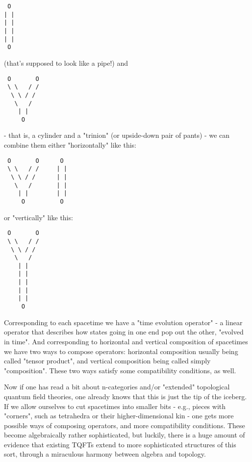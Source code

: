 \begin{verbatim}
 O
| |
| |
| |
| |
 O
\end{verbatim}
    

(that's supposed to look like a pipe!) and 

\begin{verbatim}
 O       O
 \ \   / /
  \ \ / /
   \   /
    | |
     O
\end{verbatim}
    

- that is, a cylinder and a "trinion" (or upside-down pair of pants) - 
we can combine them either "horizontally" like this:

\begin{verbatim}
 O       O      O
 \ \   / /     | |
  \ \ / /      | |
   \   /       | |
    | |        | | 
     O          O
\end{verbatim}
    

or "vertically" like this:

\begin{verbatim}
 O       O
 \ \   / /
  \ \ / /
   \   /
    | |
    | |
    | |
    | |
    | |
     O
\end{verbatim}
    

Corresponding to each spacetime we have a "time evolution operator" -
a linear operator that describes how states going in one end pop out the
other, "evolved in time".  And corresponding to horizontal and vertical 
composition of spacetimes we have two ways to compose operators: 
horizontal composition usually being called "tensor product", and 
vertical composition being called simply "composition".  These two ways 
satisfy some compatibility conditions, as well.

Now if one has read a bit about n-categories and/or "extended" topological
quantum field theories, one already knows that this is just the 
tip of the iceberg.  If we allow ourselves to cut spacetimes into 
smaller bits - e.g., pieces with "corners", such as tetrahedra or their 
higher-dimensional kin - one gets more
possible ways of composing operators, and more compatibility conditions.  These
become algebraically rather sophisticated, but luckily, there is a huge 
amount of evidence that existing TQFTs extend to more 
sophisticated structures of this sort, through a miraculous 
harmony between algebra and topology.  

